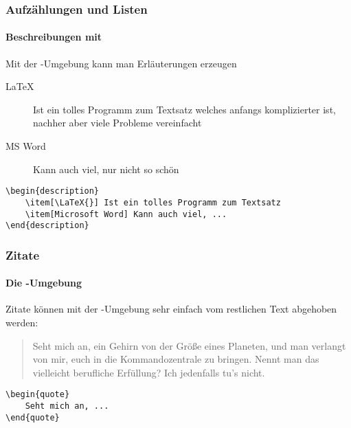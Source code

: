 \begin{frame}[fragile]
    \frametitle{Aufzählungen und Listen}
    \framesubtitle{Beschreibungen mit }
    
    Mit der -Umgebung kann man Erläuterungen erzeugen
    \medskip
    \begin{description}
        \item[\LaTeX{}] Ist ein tolles Programm zum Textsatz welches anfangs komplizierter ist, nachher aber viele Probleme vereinfacht
        \item[MS Word] Kann auch viel, nur nicht so schön
    \end{description}
    
    \bigskip
    \begin{verbatim}
\begin{description}
    \item[\LaTeX{}] Ist ein tolles Programm zum Textsatz
    \item[Microsoft Word] Kann auch viel, ...
\end{description}
    \end{verbatim}
\end{frame}


\begin{frame}[fragile]
    \frametitle{Zitate}
    \framesubtitle{Die -Umgebung}
    
    Zitate können mit der -Umgebung sehr einfach vom restlichen Text abgehoben werden:
    \begin{quote}
        Seht mich an, ein Gehirn von der Größe eines Planeten, und man verlangt von mir,
        euch in die Kommandozentrale zu bringen. Nennt man das vielleicht berufliche
        Erfüllung? Ich jedenfalls tu's nicht.
    \end{quote}
    
    \bigskip
    \begin{verbatim}
\begin{quote}
    Seht mich an, ...
\end{quote}
    \end{verbatim}
\end{frame}


